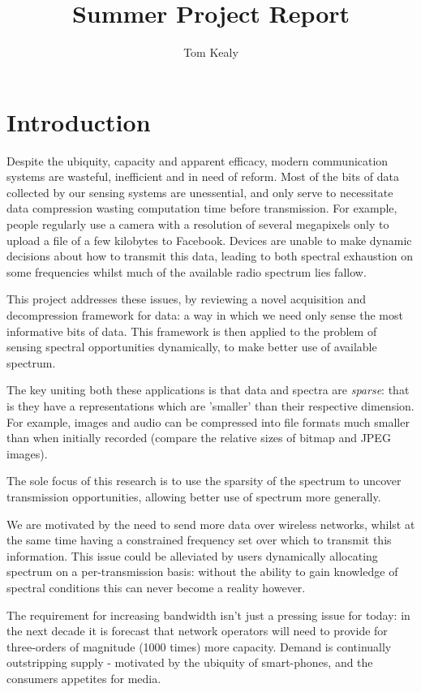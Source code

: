\documentclass[12pt, a4paper]{article}
\begin{document}
\title{Summer Project Report}
\author{Tom Kealy}



\maketitle

\section{Introduction}
Despite the ubiquity, capacity and apparent efficacy, modern communication systems are wasteful, inefficient and in need of reform. Most of the bits of data collected by our sensing systems are unessential, and only serve to necessitate data compression wasting computation time before transmission. For example, people regularly use a camera with a resolution of several megapixels only to upload a file of a few kilobytes to Facebook. Devices are unable to make dynamic decisions about how to transmit this data, leading to both spectral exhaustion on some frequencies whilst much of the available radio spectrum lies fallow. 

This project addresses these issues, by reviewing a novel acquisition and decompression framework for data: a way in which we need only sense the most informative bits of data. This framework is then applied to the problem of sensing spectral opportunities dynamically, to make better use of available spectrum. 

The key uniting both these applications is that data and spectra are \textit{sparse}: that is they have a representations which are 'smaller' than their respective dimension. For example, images and audio can be compressed into file formats much smaller than when initially recorded (compare the relative sizes of bitmap and JPEG images).

The sole focus of this research is to use the sparsity of the spectrum to uncover transmission opportunities, allowing better use of spectrum more generally. 

We are motivated by the need to send more data over wireless networks, whilst at the same time having a constrained frequency set over which to transmit this information. This issue could be alleviated by users dynamically allocating spectrum on a per-transmission basis: without the ability to gain knowledge of spectral conditions this can never become a reality however. 

The requirement for increasing bandwidth isn't just a pressing issue for today: in the next decade it is forecast that network operators will need to provide for three-orders of magnitude (1000 times) more capacity. Demand is continually outstripping supply - motivated by the ubiquity of smart-phones, and the consumers appetites for media. 
\end{document}
